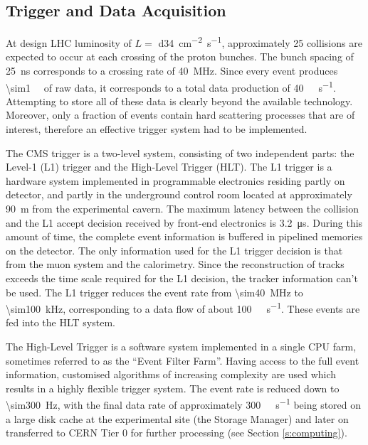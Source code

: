 \newpage
\subsection{Trigger and Data Acquisition}
\label{ss:trigger_daq}
At design LHC luminosity of $L = $ \SI{d34}{\cm^{-2} s^{-1}}, approximately \num{25} collisions are expected to occur at
each crossing of the proton bunches. The bunch spacing of \SI{25}{\ns} corresponds to a crossing rate of
\SI{40}{\mega\hertz}. Since every event produces \SI{\sim1}{\mega\byte} of raw data, it corresponds to a total data
production of \SI{40}{\tera\byte\per\second}. Attempting to store all of these data is clearly beyond the available
technology. Moreover, only a fraction of events contain hard scattering processes that are of interest, therefore an
effective trigger system had to be implemented.

The CMS trigger is a two-level system, consisting of two independent parts: the Level-1 (L1) trigger and the High-Level
Trigger (HLT). The L1 trigger is a hardware system implemented in programmable electronics residing partly on detector,
and partly in the underground control room located at approximately \SI{90}{\metre} from the experimental cavern. The
maximum latency between the collision and the L1 accept decision received by front-end electronics is
\SI{3.2}{\micro\second}. During this amount of time, the complete event information is buffered in pipelined memories
on the detector. The only information used for the L1 trigger decision is that from the muon system and the calorimetry.
Since the reconstruction of tracks exceeds the time scale required for the L1 decision, the tracker information can't be
used. The L1 trigger reduces the event rate from \SI{\sim40}{\mega\hertz} to \SI{\sim100}{\kilo\hertz}, corresponding to
a data flow of about \SI{100}{\giga\byte\per\second}. These events are fed into the HLT system.

The High-Level Trigger is a software system implemented in a single CPU farm, sometimes referred to as the ``Event
Filter Farm''. Having access to the full event information, customised algorithms of increasing complexity are used
which results in a highly flexible trigger system. The event rate is reduced down to \SI{\sim300}{\Hz}, with the final
data rate of approximately \SI{300}{\mega\byte\per\second} being stored on a large disk cache at the experimental site
(the Storage Manager) and later on transferred to CERN Tier 0 for further processing (see Section \ref{s:computing}).

